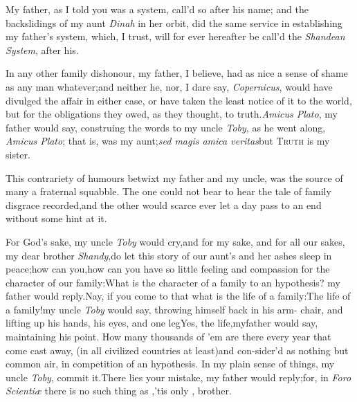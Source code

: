\documentclass{article}
\begin{document}
\tsk My father, as I told you was a\break 
{}
system, call’d so after his name; and the backslidings of my
aunt \textit{Dinah} in her orbit, did the same service in
establishing my father’s system, which, I trust, will for ever
hereafter be call’d the \textit{Shandean System}, after his.

In any other family dishonour, my father, I believe, had as nice
a sense of shame as any man whatever;\tsh  and neither he,
nor, I dare say, \textit{Copernicus}, would have divulged the affair
in either case, or have taken the least notice of it to the world,
but for the obligations they owed, as they thought, to truth.\tsk\break  \textit{Amicus
Plato}, my father would say, construing the words to my uncle
\textit{Toby}, as he went along, \textit{Amicus Plato}; that
is,\break{} was my aunt;\tsk  \textit{sed magis amica
veritas}\tsk  but \textsc{Truth} is my
sister.\\\eject

This contrariety of humours betwixt my father and my uncle, was
the source of many a fraternal squabble. The one could not bear to
hear the tale of family disgrace recorded,\tsh  and the
other would scarce ever let a day pass to an end without some hint
at it.

For God’s sake, my uncle \textit{Toby} would
cry,\tsh  and for my sake, and for all our sakes, my dear
brother \textit{Shandy},\tsk  do let this story of our aunt’s
and her ashes sleep in peace;\tsk  how can
you,\tsh\break  how can you have so little feeling and compassion
for the character of our fa\-mily:\tsh  What is the character
of a family to an hypothesis? my father would\break
reply.\tsh  Nay, if you come to that\tsk
\break  what is the
life of a family:\tsh  The life of a family!\tsk  my uncle
\textit{Toby} would say, throwing himself back in his arm-
chair, and
lifting up his hands, his eyes, and one
leg\tsh  Yes, the life,\tsh  my\break father would say,
maintaining his point. How many thousands of ’em are there
every year that come cast away, (in all civilized countries at
least)\tsh  and con-\break sider’d as nothing but common air, in
competition of an hypothesis. In my plain sense of things, my uncle
\textit{Toby},\break 
{}
commit it.\tsh  There
lies your mistake, my father would reply;\tsh  for, in
\textit{Foro Scientiæ} there is no such thing as
,\tsh  ’tis only
, brother.
\end{document}
